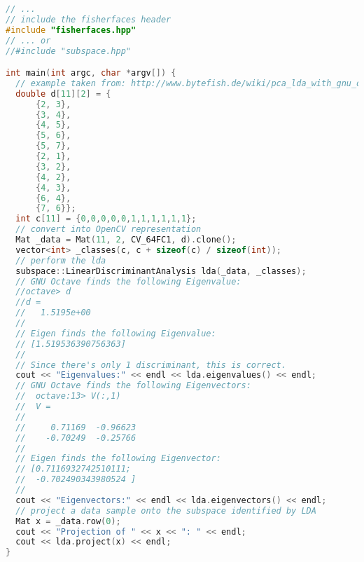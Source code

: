 \begin{lstlisting}[language=c++]
// ...
// include the fisherfaces header
#include "fisherfaces.hpp"
// ... or 
//#include "subspace.hpp"

int main(int argc, char *argv[]) {
  // example taken from: http://www.bytefish.de/wiki/pca_lda_with_gnu_octave
  double d[11][2] = {
      {2, 3},
      {3, 4},
      {4, 5},
      {5, 6},
      {5, 7},
      {2, 1},
      {3, 2},
      {4, 2},
      {4, 3},
      {6, 4},
      {7, 6}};
  int c[11] = {0,0,0,0,0,1,1,1,1,1,1};
  // convert into OpenCV representation
  Mat _data = Mat(11, 2, CV_64FC1, d).clone();
  vector<int> _classes(c, c + sizeof(c) / sizeof(int));
  // perform the lda
  subspace::LinearDiscriminantAnalysis lda(_data, _classes);
  // GNU Octave finds the following Eigenvalue:
  //octave> d
  //d =
  //   1.5195e+00
  //
  // Eigen finds the following Eigenvalue:
  // [1.519536390756363]
  //
  // Since there's only 1 discriminant, this is correct.
  cout << "Eigenvalues:" << endl << lda.eigenvalues() << endl;
  // GNU Octave finds the following Eigenvectors:
  //  octave:13> V(:,1)
  //  V =
  //
  //     0.71169  -0.96623
  //    -0.70249  -0.25766
  //
  // Eigen finds the following Eigenvector:
  // [0.7116932742510111;
  //  -0.702490343980524 ]
  //
  cout << "Eigenvectors:" << endl << lda.eigenvectors() << endl;
  // project a data sample onto the subspace identified by LDA
  Mat x = _data.row(0);
  cout << "Projection of " << x << ": " << endl;
  cout << lda.project(x) << endl;
}
\end{lstlisting}
